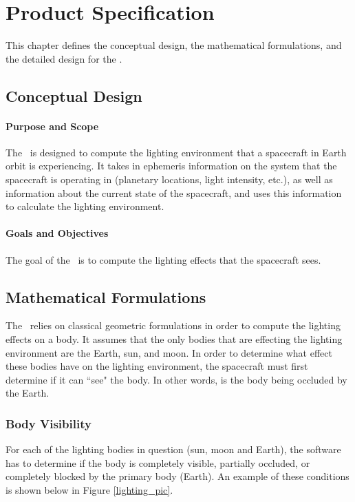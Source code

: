 \chapter{Product Specification}\label{ch:spec}

This chapter defines the conceptual design, the mathematical formulations, and
the detailed design for the \earthlightingDesc.

\section{Conceptual Design}

\subsubsection{Purpose and Scope}
The \earthlightingDesc\ is designed to compute the lighting environment that a
spacecraft in Earth orbit is experiencing.  It takes in ephemeris information
on the system that the spacecraft is operating in (planetary locations, light
intensity, etc.), as well as information about the current state of the spacecraft,
and uses this information to calculate the lighting
environment.

\subsubsection{Goals and Objectives}
The goal of the \earthlightingDesc\ is to compute the lighting effects that the
spacecraft sees.

\section{Mathematical Formulations}

The \earthlightingDesc\ relies on classical geometric formulations in order
to compute the lighting effects on a body.  It assumes that the only bodies
that are effecting the lighting environment are the Earth, sun, and moon.  In
order to determine what effect these bodies have on the lighting environment,
the spacecraft must first determine if it can ``see" the body.  In other words,
is the body being occluded by the Earth.

\subsection{Body Visibility}
For each of the lighting bodies in question (sun, moon and Earth),
the software has to
determine if the body is completely visible, partially occluded, or completely
blocked by the primary body (Earth). An example of these conditions is shown
below in Figure \ref{lighting_pic}.

